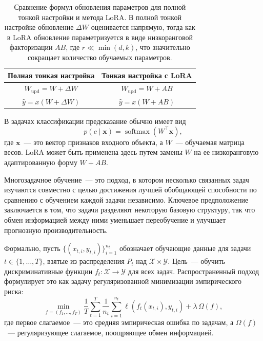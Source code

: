 \begin{table}[t]
    \caption{Сравнение формул обновления параметров для полной тонкой настройки и метода LoRA. В полной тонкой настройке обновление $\Delta W$ оценивается напрямую, тогда как в LoRA обновление параметризуется в виде низкоранговой факторизации $AB$, где $r \ll \min(d,k)$, что значительно сокращает количество обучаемых параметров.} \label{table:lora}
    \begin{center}
    \begin{tabular}{cc}
    \toprule
    \textbf{Полная тонкая настройка} & \textbf{Тонкая настройка с LoRA} \\
    \midrule
    $W_{\text{upd}} = W + \Delta W$ & $W_{\text{upd}} = W + AB$ \\
    $\hat{y} = x(W + \Delta W)$ & $\hat{y} = x(W + AB)$ \\
    \bottomrule
    \end{tabular}
    \end{center}
\end{table}

В задачах классификации предсказание обычно имеет вид
\begin{equation}
    p(c \mid \mathbf{x}) = \operatorname{softmax}(W^{\top} \mathbf{x}),
\end{equation}
где $\mathbf{x}$~--- это вектор признаков входного объекта, а $W$~--- обучаемая матрица весов.
LoRA может быть применена здесь путем замены $W$ на ее низкоранговую адаптированную форму $W + AB$.

Многозадачное обучение~--- это подход, в котором несколько связанных задач изучаются совместно с целью достижения лучшей обобщающей способности по сравнению с обучением каждой задачи независимо.
Ключевое предположение заключается в том, что задачи разделяют некоторую базовую структуру, так что обмен информацией между ними уменьшает переобучение и улучшает прогнозную производительность.

Формально, пусть $\{(x_{t,i}, y_{t,i})\}_{i=1}^{n_t}$ обозначает обучающие данные для задачи $t \in \{1,\dots,T\}$, взятые из распределения $P_t$ над $\mathcal{X} \times \mathcal{Y}$.
Цель~--- обучить дискриминативные функции $f_t : \mathcal{X} \to \mathcal{Y}$ для всех задач.
Распространенный подход формулирует это как задачу регуляризованной минимизации эмпирического риска:
\begin{equation}
    \min_{f = (f_1,\ldots,f_T)}
        \frac{1}{T} \sum_{t=1}^T \frac{1}{n_t} \sum_{i=1}^{n_t}
            \ell(f_t(x_{t,i}), y_{t,i})
        + \lambda \, \Omega(f),
\end{equation}
где первое слагаемое~--- это средняя эмпирическая ошибка по задачам, а $\Omega(f)$~--- регуляризующее слагаемое, поощряющее обмен информацией.

